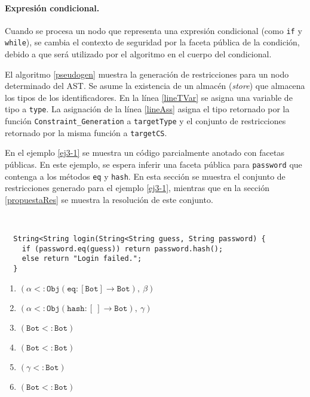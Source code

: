 \paragraph{Expresión condicional.}Cuando se procesa un nodo que representa una expresión condicional (como \texttt{if} y \texttt{while}), se cambia el contexto de seguridad por la faceta pública de la condición, debido a que será utilizado por el algoritmo en el cuerpo del condicional.

El algoritmo \ref{pseudogen} muestra la generación de restricciones para un nodo determinado del AST. Se asume la existencia de un almacén (\emph{store}) que almacena los tipos de los identificadores. En la línea \ref{lineTVar} se asigna una variable de tipo a \texttt{type}. La asignación de la línea \ref{lineAss} asigna el tipo retornado por la función \texttt{Constraint\_Generation} a \texttt{targetType} y el conjunto de restricciones retornado por la misma función a \texttt{targetCS}.

En el ejemplo \ref{ej3-1} se muestra un código parcialmente anotado con facetas públicas. En este ejemplo, se espera inferir una faceta pública para \texttt{password} que contenga a los métodos \texttt{eq} y \texttt{hash}. En esta sección se muestra el conjunto de restricciones generado para el ejemplo \ref{ej3-1}, mientras que en la sección \ref{propuestaRes} se muestra la resolución de este conjunto.

\begin{ej}\ \\
  \label{ej3-1}
  \normalfont
  \begin{lstlisting}
  String<String login(String<String guess, String password) {
    if (password.eq(guess)) return password.hash();
    else return "Login failed.";
  }
  \end{lstlisting}
  \begin{enumerate}
    \item $\mathtt{(\alpha <: Obj(eq : [Bot] \rightarrow Bot),\ \beta)}$
    \item $\mathtt{(\alpha <: Obj(hash : [\ ] \rightarrow Bot),\ \gamma)}$
    \item $\mathtt{(Bot <: Bot)}$
    \item $\mathtt{(Bot <: Bot)}$
    \item $\mathtt{(\gamma <: Bot)}$
    \item $\mathtt{(Bot <: Bot)}$
  \end{enumerate}
\end{ej}

